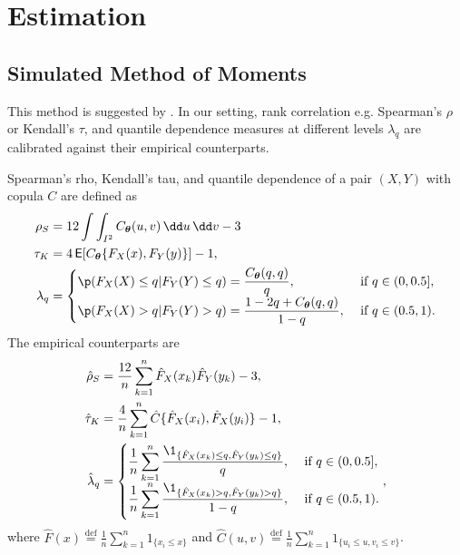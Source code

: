 
\section{Estimation}\label{sec:estimation}

\subsection{Simulated Method of Moments}\label{subsec:simulated-method-of-moments}
This method is suggested by \citep{oh2013simulated}.
In our setting, rank correlation e.g. Spearman's $\rho$ or Kendall's $\tau$,
and quantile dependence measures at different levels $\lambda_q$
are calibrated against their empirical counterparts.\medskip

Spearman's rho, Kendall's tau, and quantile dependence of a pair $(X,Y)$
with copula $C$ are defined as
\begin{align}
  \rho_S &= 12 \int\int_{I^2} C_{\bm{\theta}}(u,v)\, \dd u\, \dd v-3\label{eq:rho_S}\\
  \tau_K &= 4\operatorname{\mathsf{E}}[C_{\bm{\theta}}\{F_X(x), F_Y(y)\}]-1,\\
  \lambda_q &=
  \begin{cases}
    \p(F_X(X)\leq q| F_Y(Y)\leq q) = \displaystyle \frac{C_{\bm{\theta}}(q,q)}{q},
    &\text{ if } q\in (0,0.5],\\
    \p(F_X(X)>q|F_Y(Y)>q) =\displaystyle \frac{1-2q+C_{\bm{\theta}}(q,q)} {1-q},
    &\text{ if } q\in (0.5,1).
  \end{cases}
\end{align}\medskip
The empirical counterparts are
\begin{align*}
  \hat\rho_S &= \frac{12}{n} \sum_{k=1}^n \hat F_X(x_k) \hat F_Y(y_k)
               -3,\\
  \hat\tau_K &= \frac{4}{n}\sum_{k=1}^n \hat{C}\{\hat{F}_X(x_i),\hat{F}_X(y_i)\} -1 ,\\
  \hat\lambda_q &=
                  \begin{cases}
                    \displaystyle\frac{1}{n} \sum_{k=1}^n \frac{\1_{\{\hat
                        F_X(x_k)\leq q, \hat F_Y(y_k)\leq q\}}} {q},
                    &\text { if } q\in (0, 0.5],\\
                    \displaystyle \frac{1}{n} \sum_{k=1}^n
                    \frac{\1_{\{\hat F_X(x_k)>q, \hat F_Y(y_k)>q\}}}
                    {1-q}, &\text { if } q\in (0.5,1).
                  \end{cases},
\end{align*}
where $\hat{F}(x) \overset{\mathrm{def}}{=} \frac{1}{n}\sum_{k=1}^n 1_{\{x_i\leq x\}}$ and
$\hat{C}(u,v) \overset{\mathrm{def}}{=}  \frac{1}{n}\sum_{k=1}^n 1_{\{u_i\leq u, v_i\leq v\}}$.\medskip

